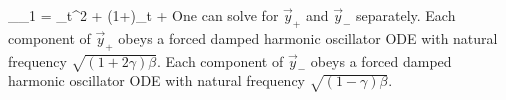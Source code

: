 \beq
\call_\beta\call_1 =
\partial_t^2 + (1+\beta)\partial_t + \beta
\eeq
One can solve for $\vec{y}_+$
and $\vec{y}_-$ separately.
Each component of $\vec{y}_+$
obeys a forced damped harmonic oscillator
ODE with natural frequency $\sqrt{(1+2\gamma)\beta}$. 
Each component of $\vec{y}_-$
obeys a forced damped harmonic oscillator
ODE with natural frequency  $\sqrt{(1-\gamma)\beta}$.


%
%
%
